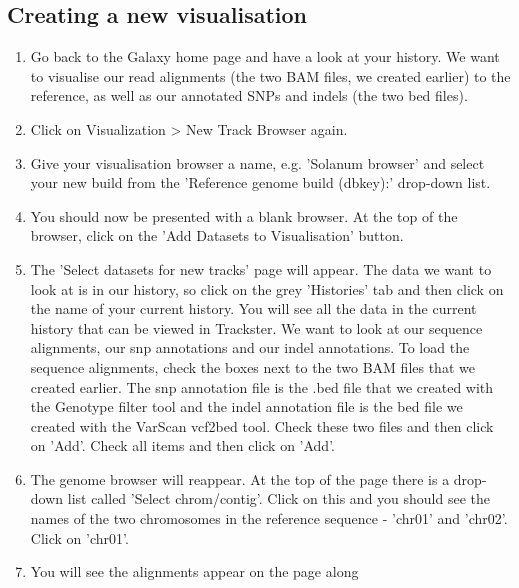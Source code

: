 \documentclass[12pt,a4paper]{article}
\begin{document}
\subsection{Creating a new visualisation}
\begin{enumerate}
        \item Go back to the Galaxy home page and have a look at your
          history. We want to visualise our read alignments (the two
          BAM files, we created earlier) to the reference, as well as
          our annotated SNPs and indels (the two bed files).  %
	\item Click on Visualization > New Track Browser again.
	\item Give your visualisation browser a name, e.g. 'Solanum
          browser' and select your new build from the 'Reference
          genome build (dbkey):' drop-down list.
	\item You should now be presented with a blank browser. At the
          top of the browser, click on the 'Add Datasets to
          Visualisation' button.
	\item The 'Select datasets for new tracks' page will
          appear. The data we want to look at is in our history, so
          click on the grey 'Histories' tab and then click on the name
          of your current history. You will see all the data in the
          current history that can be viewed in Trackster. We want to
          look at our sequence alignments, our snp annotations and our
          indel annotations. To load the sequence alignments, check
          the boxes next to the two BAM files that we created
          earlier. The snp annotation file is the .bed file that we
          created with the Genotype filter tool and the indel
          annotation file is the bed file we created with the VarScan
          vcf2bed tool. Check these two files and then click on 'Add'.
          Check all items and then click on 'Add'. 
	\item The genome browser will reappear. At the top of the page
          there is a drop-down list called 'Select
          chrom/contig'. Click on this and you should see the names of
          the two chromosomes in the reference sequence - 'chr01' and
          'chr02'. Click on 'chr01'.
	\item You will see the alignments appear on the page along

\end{enumerate}
\end{document}

